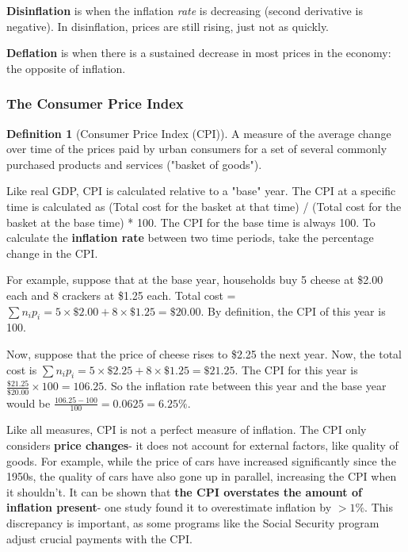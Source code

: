 \documentclass[12pt, a4paper]{article}
\theoremstyle{definition}
\newtheorem{definition}{Definition}
\begin{document}
\textbf{Disinflation} is when the inflation \textit{rate} is decreasing (second derivative is negative).
In disinflation, prices are still rising, just not as quickly.

\textbf{Deflation} is when there is a sustained decrease in most prices in the economy: the opposite of inflation.

\subsubsection{The Consumer Price Index}
\begin{definition}[Consumer Price Index (CPI)]
    A measure of the average change over time of the prices paid by urban consumers for a set of several commonly purchased products and services ("basket of goods").
\end{definition}

Like real GDP, CPI is calculated relative to a "base" year.
The CPI at a specific time is calculated as (Total cost for the basket at that time) / (Total cost for the basket at the base time) * 100.
The CPI for the base time is always 100.
To calculate the \textbf{inflation rate} between two time periods, take the percentage change in the CPI.

For example, suppose that at the base year, households buy 5 cheese at \$2.00 each and 8 crackers at \$1.25 each.
Total cost = $\sum n_i p_i = 5 \times \$2.00 + 8 \times \$1.25 = \$20.00$.
By definition, the CPI of this year is 100.

Now, suppose that the price of cheese rises to \$2.25 the next year. Now, the total cost is $\sum n_i p_i = 5 \times \$2.25 + 8 \times \$1.25 = \$21.25$.
The CPI for this year is $\frac{\$21.25}{\$20.00} \times 100 = 106.25$.
So the inflation rate between this year and the base year would be $\frac{106.25 - 100}{100} = 0.0625 = 6.25\%$.

Like all measures, CPI is not a perfect measure of inflation.
The CPI only considers \textbf{price changes}- it does not account for external factors, like quality of goods.
For example, while the price of cars have increased significantly since the 1950s, the quality of cars have also gone up in parallel, increasing the CPI when it shouldn't.
It can be shown that \textbf{the CPI overstates the amount of inflation present}- one study found it to overestimate inflation by $>1\%$.
This discrepancy is important, as some programs like the Social Security program adjust crucial payments with the CPI.
\end{document}
